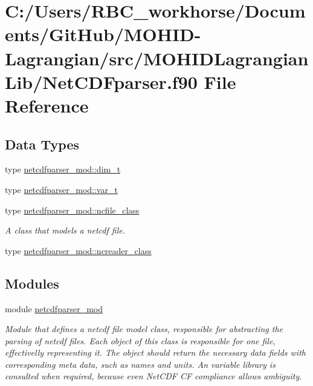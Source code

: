 \hypertarget{_net_c_d_fparser_8f90}{}\section{C\+:/\+Users/\+R\+B\+C\+\_\+workhorse/\+Documents/\+Git\+Hub/\+M\+O\+H\+I\+D-\/\+Lagrangian/src/\+M\+O\+H\+I\+D\+Lagrangian\+Lib/\+Net\+C\+D\+Fparser.f90 File Reference}
\label{_net_c_d_fparser_8f90}
\subsection*{Data Types}
\begin{DoxyCompactItemize}
\item 
type \mbox{\hyperlink{structnetcdfparser__mod_1_1dim__t}{netcdfparser\+\_\+mod\+::dim\+\_\+t}}
\item 
type \mbox{\hyperlink{structnetcdfparser__mod_1_1var__t}{netcdfparser\+\_\+mod\+::var\+\_\+t}}
\item 
type \mbox{\hyperlink{structnetcdfparser__mod_1_1ncfile__class}{netcdfparser\+\_\+mod\+::ncfile\+\_\+class}}
\begin{DoxyCompactList}\small\item\em A class that models a netcdf file. \end{DoxyCompactList}\item 
type \mbox{\hyperlink{structnetcdfparser__mod_1_1ncreader__class}{netcdfparser\+\_\+mod\+::ncreader\+\_\+class}}
\end{DoxyCompactItemize}
\subsection*{Modules}
\begin{DoxyCompactItemize}
\item 
module \mbox{\hyperlink{namespacenetcdfparser__mod}{netcdfparser\+\_\+mod}}
\begin{DoxyCompactList}\small\item\em Module that defines a netcdf file model class, responsible for abstracting the parsing of netcdf files. Each object of this class is responsible for one file, effectivelly representing it. The object should return the necessary data fields with corresponding meta data, such as names and units. An variable library is consulted when required, because even Net\+C\+DF CF compliance allows ambiguity. \end{DoxyCompactList}\end{DoxyCompactItemize}
